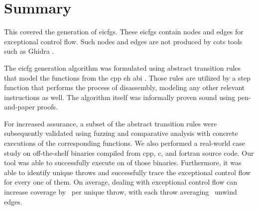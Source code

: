\section{Summary}
This  covered the generation of \glspl{eicfg}.
These \glspl{eicfg} contain nodes and edges for exceptional control flow.
Such nodes and edges are not produced by \gls{cots} tools such as Ghidra \autocite{ghidra}.

The \gls{eicfg} generation algorithm was formulated using abstract transition rules that model the functions from the \gls{cpp} \gls{eh} \gls{abi} \autocite{cxxEhAbi}.
Those rules are utilized by a step function that performs the process of disassembly, modeling any other relevant instructions as well.
The algorithm itself was informally proven sound using pen-and-paper proofs.

For increased assurance, a subset of the abstract transition rules were subsequently validated using fuzzing and comparative analysis with  concrete executions of the corresponding functions.
We also performed a real-world case study on  off-the-shelf binaries compiled from \gls{cpp}, \gls{c}, and \gls{fortran} source code.
Our tool was able to successfully execute on  of those binaries.
Furthermore, it was able to identify  unique throws and successfully trace the exceptional control flow for every one of them.
On average, dealing with exceptional control flow can increase coverage by \avgdiffinst\ per unique throw, with each throw averaging \avgunwinds\ unwind edges.
